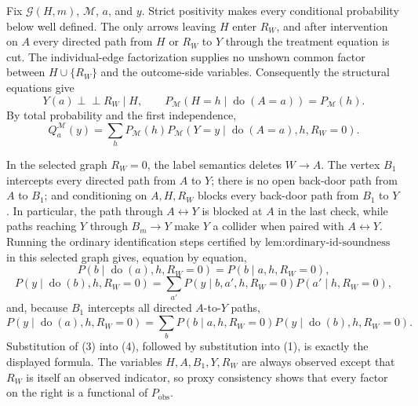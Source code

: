 Fix \(\mathcal G(H,m)\), \(\mathcal M\), \(a\), and \(y\). Strict positivity makes every conditional probability below well defined. The only arrows leaving \(H\) enter \(R_W\), and after intervention on \(A\) every directed path from \(H\) or \(R_W\) to \(Y\) through the treatment equation is cut. The individual-edge factorization supplies no unshown common factor between \(H\cup\{R_W\}\) and the outcome-side variables. Consequently the structural equations give
\[
Y(a)\mathbin{\perp\!\!\!\perp}R_W\mid H,
\qquad
P_{\mathcal M}(H=h\mid\operatorname{do}(A=a))=P_{\mathcal M}(h).
\]
By total probability and the first independence,
\[
Q_a^{\mathcal M}(y)
=\sum_hP_{\mathcal M}(h)
P_{\mathcal M}(Y=y\mid\operatorname{do}(A=a),h,R_W=0).
\tag{1}
\]

In the selected graph \(R_W=0\), the label semantics deletes \(W\to A\). The vertex \(B_1\) intercepts every directed path from \(A\) to \(Y\); there is no open back-door path from \(A\) to \(B_1\); and conditioning on \(A,H,R_W\) blocks every back-door path from \(B_1\) to \(Y\). In particular, the path through \(A\leftrightarrow Y\) is blocked at \(A\) in the last check, while paths reaching \(Y\) through \(B_m\to Y\) make \(Y\) a collider when paired with \(A\leftrightarrow Y\). Running the ordinary identification steps certified by \(\text{lem:ordinary-id-soundness}\) in this selected graph gives, equation by equation,
\[
P(b\mid\operatorname{do}(a),h,R_W=0)=P(b\mid a,h,R_W=0),
\tag{2}
\]
\[
P(y\mid\operatorname{do}(b),h,R_W=0)
=\sum_{a'}P(y\mid b,a',h,R_W=0)P(a'\mid h,R_W=0),
\tag{3}
\]
and, because \(B_1\) intercepts all directed \(A\)-to-\(Y\) paths,
\[
P(y\mid\operatorname{do}(a),h,R_W=0)
=\sum_bP(b\mid a,h,R_W=0)P(y\mid\operatorname{do}(b),h,R_W=0).
\tag{4}
\]
Substitution of (3) into (4), followed by substitution into (1), is exactly the displayed formula. The variables \(H,A,B_1,Y,R_W\) are always observed except that \(R_W\) is itself an observed indicator, so proxy consistency shows that every factor on the right is a functional of \(P_{\mathrm{obs}}\).